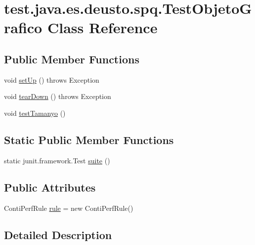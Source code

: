 \hypertarget{classtest_1_1java_1_1es_1_1deusto_1_1spq_1_1_test_objeto_grafico}{}\section{test.\+java.\+es.\+deusto.\+spq.\+Test\+Objeto\+Grafico Class Reference}
\label{classtest_1_1java_1_1es_1_1deusto_1_1spq_1_1_test_objeto_grafico}
\subsection*{Public Member Functions}
\begin{DoxyCompactItemize}
\item 
void \hyperlink{classtest_1_1java_1_1es_1_1deusto_1_1spq_1_1_test_objeto_grafico_a426010615402253c98d1e08e1403b0f1}{set\+Up} ()  throws Exception 
\item 
void \hyperlink{classtest_1_1java_1_1es_1_1deusto_1_1spq_1_1_test_objeto_grafico_aa9730e4bbb1036cd198bd2f71d520e62}{tear\+Down} ()  throws Exception 
\item 
void \hyperlink{classtest_1_1java_1_1es_1_1deusto_1_1spq_1_1_test_objeto_grafico_a94feb62634d7d894c43446d1a5edf1c1}{test\+Tamanyo} ()
\end{DoxyCompactItemize}
\subsection*{Static Public Member Functions}
\begin{DoxyCompactItemize}
\item 
static junit.\+framework.\+Test \hyperlink{classtest_1_1java_1_1es_1_1deusto_1_1spq_1_1_test_objeto_grafico_adcaa0a065e086b90e097adf89a7b220e}{suite} ()
\end{DoxyCompactItemize}
\subsection*{Public Attributes}
\begin{DoxyCompactItemize}
\item 
Conti\+Perf\+Rule \hyperlink{classtest_1_1java_1_1es_1_1deusto_1_1spq_1_1_test_objeto_grafico_ab09daf1234d471e4a3fda9be3d8c3f0c}{rule} = new Conti\+Perf\+Rule()
\end{DoxyCompactItemize}


\subsection{Detailed Description}


